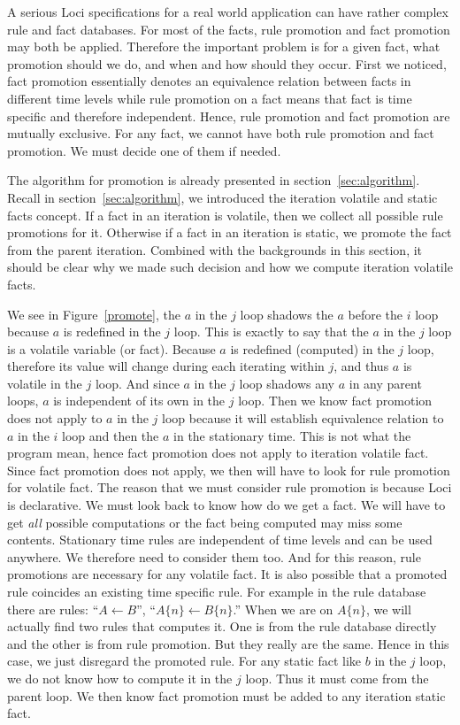 \documentclass{article}
\begin{document}
A serious Loci specifications for a real world application can have
rather complex rule and fact databases. For most of the facts, rule
promotion and fact promotion may both be applied. Therefore the
important problem is for a given fact, what promotion should we do,
and when and how should they occur. First we noticed, fact promotion
essentially denotes an equivalence relation between facts in different
time levels while rule promotion on a fact means that fact is time
specific and therefore independent. Hence, rule promotion and fact
promotion are mutually
exclusive. For any fact, we cannot have both rule promotion and fact
promotion. We must decide one of them if needed. 

The algorithm for promotion is already presented in
section~\ref{sec:algorithm}. Recall in section~\ref{sec:algorithm}, we
introduced the iteration volatile and static facts concept. If a fact
in an iteration is volatile, then we collect all possible rule
promotions for it. Otherwise if a fact in an iteration is static, we
promote the fact from the parent iteration. Combined with the
backgrounds in this section, it should be clear why we made such
decision and how we compute iteration volatile facts. 

We see in Figure~\ref{promote}, the $a$ in the $j$ loop shadows the
$a$ before the $i$ loop because $a$ is redefined in the $j$ loop. This
is exactly to say that the $a$ in the $j$ loop is a volatile variable
(or fact). Because $a$ is redefined (computed) in the $j$ loop,
therefore its value will change during each iterating within $j$, and
thus $a$ is volatile in the $j$ loop. And since $a$ in the $j$ loop
shadows any $a$ in any parent loops, $a$ is independent of its own in
the $j$ loop. Then we know fact promotion does not apply to $a$ in
the $j$ 
loop because it will establish equivalence relation to $a$ in the $i$
loop and then the $a$ in the stationary time. This is not what the
program mean, hence fact promotion does not
apply to iteration volatile fact. Since fact promotion does not apply,
we then will have to look for rule promotion for volatile fact. The
reason that we must consider rule promotion is because Loci is
declarative. We must look back to know how do we get a fact. We
will have to get {\it all} possible computations or the fact being
computed may miss some contents. Stationary time rules are independent
of time levels and can be used anywhere. We therefore need to consider
them too. And for this reason, rule promotions are necessary for any
volatile fact. It is also possible that a promoted rule coincides an
existing time specific rule. For example in the rule database there
are rules: ``$A \gets B$'', ``$A\{n\} \gets B\{n\}$.'' When we are on
$A\{n\}$, we will actually find two rules that computes it. One is
from the rule database directly and the other is from rule
promotion. But they really are the same. Hence in this case, we just
disregard the promoted rule. For any static fact like $b$ in the
$j$ loop, we do not know how to compute it in the $j$ loop. Thus
it must come from the parent loop. We then know fact promotion must be
added to any iteration static fact. 
\end{document}
